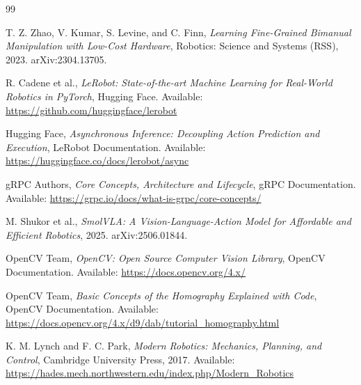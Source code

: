 \documentclass[titlepage]{pnureport}
\begin{document}
\begin{thebibliography}{99}

T. Z. Zhao, V. Kumar, S. Levine, and C. Finn,
\textit{Learning Fine-Grained Bimanual Manipulation with Low-Cost Hardware}, Robotics: Science and Systems (RSS), 2023. arXiv:2304.13705.

R. Cadene et al.,
\textit{LeRobot: State-of-the-art Machine Learning for Real-World Robotics in PyTorch}, Hugging Face.
Available: \url{https://github.com/huggingface/lerobot}

Hugging Face,
\textit{Asynchronous Inference: Decoupling Action Prediction and Execution}, LeRobot Documentation.
Available: \url{https://huggingface.co/docs/lerobot/async}

gRPC Authors,
\textit{Core Concepts, Architecture and Lifecycle}, gRPC Documentation.
Available: \url{https://grpc.io/docs/what-is-grpc/core-concepts/}

M. Shukor et al.,
\textit{SmolVLA: A Vision-Language-Action Model for Affordable and Efficient Robotics}, 2025. arXiv:2506.01844.

OpenCV Team,
\textit{OpenCV: Open Source Computer Vision Library}, OpenCV Documentation.
Available: \url{https://docs.opencv.org/4.x/}

OpenCV Team,
\textit{Basic Concepts of the Homography Explained with Code}, OpenCV Documentation.
Available: \url{https://docs.opencv.org/4.x/d9/dab/tutorial_homography.html}

K. M. Lynch and F. C. Park,
\textit{Modern Robotics: Mechanics, Planning, and Control}, Cambridge University Press, 2017.
Available: \url{https://hades.mech.northwestern.edu/index.php/Modern_Robotics}

\end{thebibliography}
\end{document}

